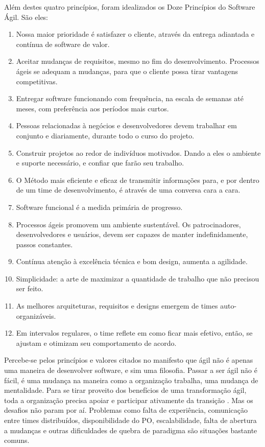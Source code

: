 \documentclass[a4paper,11pt]{article}
\begin{document}
Além destes quatro princípios, foram idealizados os Doze Princípios do Software Ágil. São eles:
\begin{enumerate}
	\item Nossa maior prioridade é satisfazer o cliente, através da entrega adiantada e contínua de software de valor.
	\item Aceitar mudanças de requisitos, mesmo no fim do desenvolvimento. Processos ágeis se adequam a mudanças, para que o cliente possa tirar vantagens competitivas.
	\item Entregar software funcionando com frequência, na escala de semanas até meses, com preferência aos períodos mais curtos.
	\item Pessoas relacionadas à negócios e desenvolvedores devem trabalhar em conjunto e diariamente, durante todo o curso do projeto.
	\item Construir projetos ao redor de indivíduos motivados. Dando a eles o ambiente e suporte necessário, e confiar que farão seu trabalho.
	\item O Método mais eficiente e eficaz de transmitir informações para, e por dentro de um time de desenvolvimento, é através de uma conversa cara a cara.
	\item Software funcional é a medida primária de progresso.
	\item Processos ágeis promovem um ambiente sustentável. Os patrocinadores, desenvolvedores e usuários, devem ser capazes de manter indefinidamente, passos constantes.
	\item Contínua atenção à excelência técnica e bom design, aumenta a agilidade.
	\item Simplicidade: a arte de maximizar a quantidade de trabalho que não precisou ser feito.
	\item As melhores arquiteturas, requisitos e designs emergem de times auto-organizáveis.
	\item Em intervalos regulares, o time reflete em como ficar mais efetivo, então, se ajustam e otimizam seu comportamento de acordo.
\end{enumerate}

Percebe-se pelos princípios e valores citados no manifesto que ágil não é apenas uma maneira de desenvolver software, e sim uma filosofia. Passar a ser ágil não é fácil, é uma mudança na maneira como a organização trabalha, uma mudança de mentalidade. Para se tirar proveito dos benefícios de uma transformação ágil, toda a organização precisa apoiar e participar ativamente da transição \cite{Kirsi2013}. Mas os desafios não param por aí. Problemas como falta de experiência, comunicação entre times distribuídos, disponibilidade do PO, escalabilidade, falta de abertura a mudanças e  outras dificuldades de quebra de paradigma são situações bastante comuns.
\end{document}
